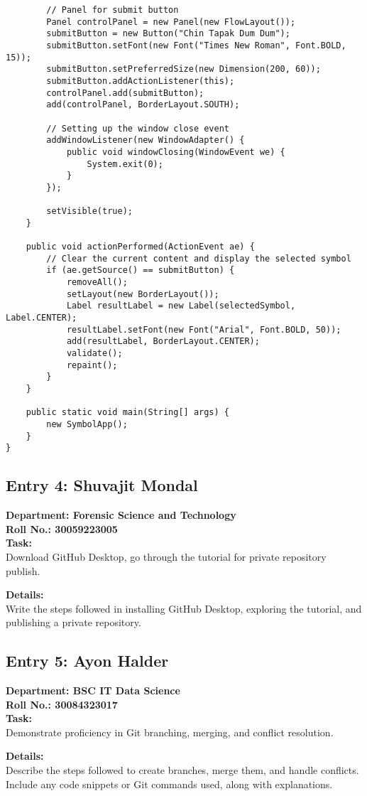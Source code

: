 \documentclass[a4paper,12pt]{article}
\begin{document}
\begin{verbatim}
        // Panel for submit button
        Panel controlPanel = new Panel(new FlowLayout());
        submitButton = new Button("Chin Tapak Dum Dum");
        submitButton.setFont(new Font("Times New Roman", Font.BOLD, 15));
        submitButton.setPreferredSize(new Dimension(200, 60));
        submitButton.addActionListener(this);
        controlPanel.add(submitButton);
        add(controlPanel, BorderLayout.SOUTH);

        // Setting up the window close event
        addWindowListener(new WindowAdapter() {
            public void windowClosing(WindowEvent we) {
                System.exit(0);
            }
        });

        setVisible(true);
    }

    public void actionPerformed(ActionEvent ae) {
        // Clear the current content and display the selected symbol
        if (ae.getSource() == submitButton) {
            removeAll();
            setLayout(new BorderLayout());
            Label resultLabel = new Label(selectedSymbol, Label.CENTER);
            resultLabel.setFont(new Font("Arial", Font.BOLD, 50));
            add(resultLabel, BorderLayout.CENTER);
            validate();
            repaint();
        }
    }

    public static void main(String[] args) {
        new SymbolApp();
    }
}
\end{verbatim}
\newpage

\subsection{Entry 4: Shuvajit Mondal}
\textbf{Department: Forensic Science and Technology} \\
\textbf{Roll No.: 30059223005} \\

\textbf{Task:} \\
Download GitHub Desktop, go through the tutorial for private repository publish.

\textbf{Details:} \\
Write the steps followed in installing GitHub Desktop, exploring the tutorial, and publishing a private repository.

\subsection{Entry 5: Ayon Halder}
\textbf{Department: BSC IT Data Science} \\
\textbf{Roll No.: 30084323017} \\

\textbf{Task:} \\
Demonstrate proficiency in Git branching, merging, and conflict resolution.

\textbf{Details:} \\
Describe the steps followed to create branches, merge them, and handle conflicts. Include any code snippets or Git commands used, along with explanations.
\end{document}
